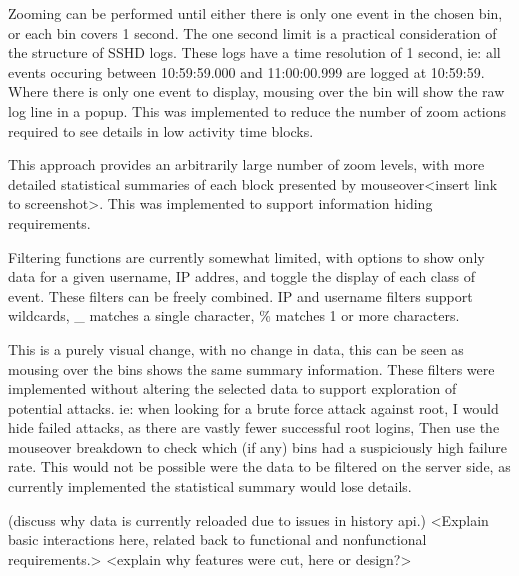 Zooming can be performed until either there is only one event in the chosen bin, or each bin covers 1 second. The one second limit is a practical consideration of the structure of SSHD logs. These logs have a time resolution of 1 second, ie:  all events occuring between 10:59:59.000 and 11:00:00.999 are logged at 10:59:59. Where there is only one event to display, mousing over the bin will show the raw log line in a popup. This was implemented to reduce the number of zoom actions required to see details in low activity time blocks. 

This approach provides an arbitrarily large number of zoom levels, with more detailed statistical summaries of each block presented by mouseover<insert link to screenshot>. This was implemented to support information hiding requirements. 

Filtering functions are currently somewhat limited, with options to show only data for a given username, IP addres, and toggle the display of each class of event. These filters can be freely combined. IP and username filters support wildcards, \_ matches a single character, \% matches 1 or more characters. 

This is a purely visual change, with no change in data, this can be seen as mousing over the bins shows the same summary information. These filters were implemented without altering the selected data to support exploration of potential attacks. ie: when looking for a brute force attack against root, I would hide failed attacks, as there are vastly fewer successful root logins, Then use the mouseover breakdown to check which (if any) bins had a suspiciously high failure rate. This would not be possible were the data to be filtered on the server side, as currently implemented the statistical summary would lose details.

(discuss why data is currently reloaded due to issues in history api.) 
<Explain basic interactions here, related back to functional and nonfunctional requirements.>
<explain why features were cut, here or design?>

